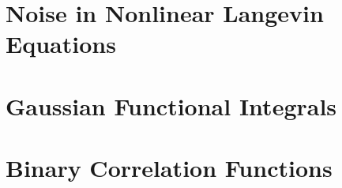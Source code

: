 \documentclass[11pt, letterpaper, twoside, openright]{book}
\begin{document}
\chapter{Noise in Nonlinear Langevin Equations}
\begin{refsection}

\printbibliography
\end{refsection}

\chapter{Gaussian Functional Integrals}
\begin{refsection}

\printbibliography
\end{refsection}

\chapter{Binary Correlation Functions}
\begin{refsection}

\printbibliography
\end{refsection}
\end{document}

